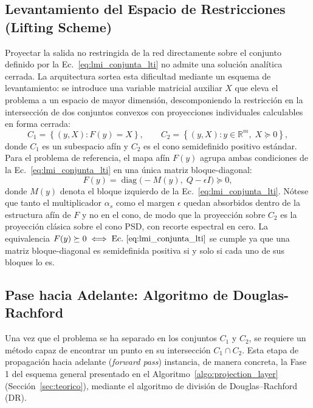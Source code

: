 \subsection{Levantamiento del Espacio de Restricciones (Lifting Scheme)}
\label{subsec:lifting}

Proyectar la salida no restringida de la red directamente sobre el conjunto definido 
por la Ec.~\eqref{eq:lmi_conjunta_lti} no admite una solución analítica cerrada. La 
arquitectura sortea esta dificultad mediante un esquema de levantamiento: se introduce 
una variable matricial auxiliar $X$ que eleva el problema a un espacio de mayor 
dimensión, descomponiendo la restricción en la intersección de dos conjuntos convexos 
con proyecciones individuales calculables en forma cerrada:
\begin{equation}
    C_1 = \left\{ (y, X) : F(y) = X \right\}, \qquad 
    C_2 = \left\{ (y, X) : y \in \mathbb{R}^{m},\; X \succeq 0 \right\},
    \label{eq:conjuntos_c1_c2}
\end{equation}
donde $C_1$ es un subespacio afín y $C_2$ es el cono semidefinido positivo estándar. 
Para el problema de referencia, el mapa afín $F(y)$ agrupa ambas condiciones de la 
Ec.~\eqref{eq:lmi_conjunta_lti} en una única matriz bloque-diagonal:
\begin{equation}
    F(y) = \operatorname{diag}\Big( 
        -M(y),\; Q - \epsilon I 
    \Big) \succeq 0,
    \label{eq:F_lti_bloques}
\end{equation}
donde $M(y)$ denota el bloque izquierdo de la Ec.~\eqref{eq:lmi_conjunta_lti}. Nótese 
que tanto el multiplicador $\alpha_s$ como el margen $\epsilon$ quedan absorbidos 
dentro de la estructura afín de $F$ y no en el cono, de modo que la proyección 
sobre $C_2$ es la proyección clásica sobre el cono PSD, con recorte espectral en cero. 
La equivalencia $F(y) \succeq 0 \iff \text{Ec.~\eqref{eq:lmi_conjunta_lti}}$ se cumple ya que una matriz bloque-diagonal es semidefinida positiva si y solo si cada uno 
de sus bloques lo es.










\subsection{Pase hacia Adelante: Algoritmo de Douglas-Rachford}
\label{subsec:dr_forward}

Una vez que el problema se ha separado en los conjuntos $C_1$ y $C_2$, se requiere un método 
capaz de encontrar un punto en su intersección $C_1 \cap C_2$. Esta etapa de propagación hacia 
adelante (\textit{forward pass}) instancia, de manera concreta, la Fase 1 del esquema general 
presentado en el Algoritmo~\ref{algo:projection_layer} (Sección~\ref{sec:teorico}), mediante el 
algoritmo de división de Douglas--Rachford (DR).

